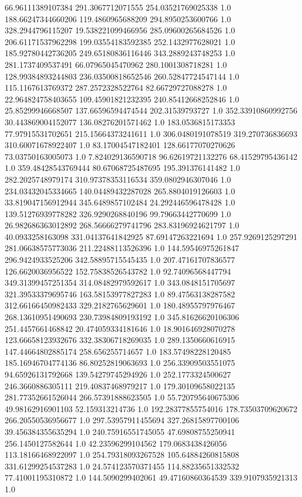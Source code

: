 66.96111389107384	291.3067712071555	254.03521769025338	1.0
188.66247344660206	119.4860965688209	294.8950253600766	1.0
328.2944796115207	19.538221099466956	285.09600265684526	1.0
206.61171537962298	199.03554183592385	252.1432977628021	1.0
185.92780442736205	249.65180836116446	343.2889243748253	1.0
281.1737409537491	66.07965045470962	280.1001308718281	1.0
128.99384893244803	236.03500818652546	260.52847724547144	1.0
115.1167613769372	287.2572328522764	82.66729727088278	1.0
22.964824758403655	109.45901821232395	240.85412668252846	1.0
25.85299946668507	137.66596594474544	202.31539793727	1.0
352.33910860992756	30.443869004152077	136.08276201571462	1.0
183.0536815173353	77.97915531702651	215.15664373241611	1.0
306.0480191078519	319.270736836693	310.60071678922407	1.0
83.17004547182401	128.66177070270626	73.03750163005073	1.0
7.824029136590718	96.62619721132276	68.41529795436142	1.0
359.48428543769444	80.67068725487695	195.391376141482	1.0
282.2025748979174	310.97378353116534	359.0802946307046	1.0
234.03432045334665	140.04489432287028	265.8804019126603	1.0
33.819047156912944	345.6489857102484	24.292446596478428	1.0
139.51276939778282	326.9290268840196	99.79663442770699	1.0
26.982686363012892	268.56666279741796	283.83196924621797	1.0
40.0933258163098	331.04137641842925	87.69147263221694	1.0
257.9269125297291	281.06638575773036	211.22488113526396	1.0
144.59546975261847	296.9424933525206	342.58895715545435	1.0
207.47161707836577	126.6620036956522	152.75838526543782	1.0
92.74096568447794	349.31399457251354	314.08482979592617	1.0
343.0848151705697	321.39533379695746	163.58153977827283	1.0
89.47563138287582	312.66166450982433	329.2182765629601	1.0
180.48955797976467	268.13610951490693	230.73984809193192	1.0
345.81626620106306	251.4457661468842	20.474059334181646	1.0
18.901646928070278	123.66658123932676	332.38306718269035	1.0
289.1350660616915	147.44664802885174	258.656255714657	1.0
183.57498228120485	185.16946704774136	86.80252819063693	1.0
256.33909503551075	94.65926131792668	139.54279745294926	1.0
252.1773324500627	246.3660886305111	219.40837468979217	1.0
179.30109658022135	281.77352661526044	266.57391888623505	1.0
55.720795640675306	49.98162916901103	52.159313214736	1.0
192.28377855754016	178.73503709620672	266.20550536956677	1.0
297.53957911455694	327.26815897700106	39.456384355635294	1.0
240.75916551745055	47.69808755250941	256.1450127582644	1.0
42.23596299104562	179.0683438426056	113.18166468922097	1.0
254.79318093267528	105.64884260815808	331.61299254537283	1.0
24.574123570371455	114.88235651332532	77.41001195310872	1.0
144.5090299402061	49.47160860364539	339.9107935921313	1.0
